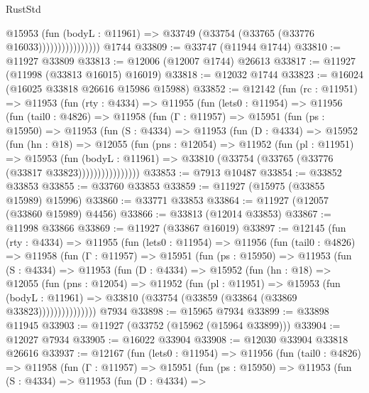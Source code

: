 \begin{lexlean}{RustStd}
\begin{coremodule}
                          @15953
                            (fun (bodyL : @11961) =>
                            @33749 (@33754 (@33765 (@33776 @16033))))))))))))))))
    @1744
@33809 := @33747 (@11944 @1744)
@33810 := @11927 @33809
@33813 := @12006 (@12007 @1744) @26613
@33817 := @11927 (@11998 (@33813 @16015) @16019)
@33818 := @12032 @1744
@33823 := @16024 (@16025 @33818 @26616 @15986 @15988)
@33852 := @12142
    (fun (rc : @11951) =>
    @11953
      (fun (rty : @4334) =>
      @11955
        (fun (lets0 : @11954) =>
        @11956
          (fun (tail0 : @4826) =>
          @11958
            (fun (Γ : @11957) =>
            @15951
              (fun (ps : @15950) =>
              @11953
                (fun (S : @4334) =>
                @11953
                  (fun (D : @4334) =>
                  @15952
                    (fun (hn : @18) =>
                    @12055
                      (fun (pns : @12054) =>
                      @11952
                        (fun (pl : @11951) =>
                        @15953
                          (fun (bodyL : @11961) =>
                          @33810 (@33754 (@33765 (@33776 (@33817 @33823))))))))))))))))
@33853 := @7913 @10487
@33854 := @33852 @33853
@33855 := @33760 @33853
@33859 := @11927 (@15975 (@33855 @15989) @15996)
@33860 := @33771 @33853
@33864 := @11927 (@12057 (@33860 @15989) @4456)
@33866 := @33813 (@12014 @33853)
@33867 := @11998 @33866
@33869 := @11927 (@33867 @16019)
@33897 := @12145
    (fun (rty : @4334) =>
    @11955
      (fun (lets0 : @11954) =>
      @11956
        (fun (tail0 : @4826) =>
        @11958
          (fun (Γ : @11957) =>
          @15951
            (fun (ps : @15950) =>
            @11953
              (fun (S : @4334) =>
              @11953
                (fun (D : @4334) =>
                @15952
                  (fun (hn : @18) =>
                  @12055
                    (fun (pns : @12054) =>
                    @11952
                      (fun (pl : @11951) =>
                      @15953
                        (fun (bodyL : @11961) =>
                        @33810 (@33754 (@33859 (@33864 (@33869 @33823)))))))))))))))
    @7934
@33898 := @15965 @7934
@33899 := @33898 @11945
@33903 := @11927 (@33752 (@15962 (@15964 @33899)))
@33904 := @12027 @7934
@33905 := @16022 @33904
@33908 := @12030 @33904 @33818 @26616
@33937 := @12167
    (fun (lets0 : @11954) =>
    @11956
      (fun (tail0 : @4826) =>
      @11958
        (fun (Γ : @11957) =>
        @15951
          (fun (ps : @15950) =>
          @11953
            (fun (S : @4334) =>
            @11953
              (fun (D : @4334) =>

\end{coremodule}
\end{lexlean}
